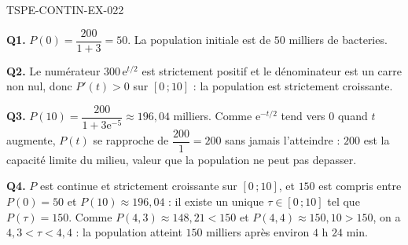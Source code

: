 \begin{corrige}{TSPE-CONTIN-EX-022}

\textbf{Q1.} $P(0) = \dfrac{200}{1+3} = 50$. La population initiale est de $50$ milliers de bacteries.

\textbf{Q2.} Le numérateur $300\,\mathrm{e}^{t/2}$ est strictement positif et le dénominateur est un carre non nul, donc $P'(t) > 0$ sur $[0\,;10]$ : la population est strictement croissante.

\textbf{Q3.} $P(10) = \dfrac{200}{1+3\mathrm{e}^{-5}} \approx 196{,}04$ milliers. Comme $\mathrm{e}^{-t/2}$ tend vers $0$ quand $t$ augmente, $P(t)$ se rapproche de $\dfrac{200}{1} = 200$ sans jamais l'atteindre : $200$ est la capacité limite du milieu, valeur que la population ne peut pas depasser.

\textbf{Q4.} $P$ est continue et strictement croissante sur $[0\,;10]$, et $150$ est compris entre $P(0) = 50$ et $P(10) \approx 196{,}04$ : il existe un unique $\tau \in [0\,;10]$ tel que $P(\tau) = 150$. Comme $P(4{,}3) \approx 148{,}21 < 150$ et $P(4{,}4) \approx 150{,}10 > 150$, on a $4{,}3 < \tau < 4{,}4$ : la population atteint $150$ milliers après environ $4$ h $24$ min.
\end{corrige}
